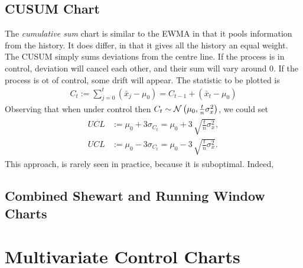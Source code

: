 \subsection{CUSUM Chart}
The \emph{cumulative sum} chart is similar to the EWMA in that it pools information from the history. 
It does differ, in that it gives all the history an equal weight. 
The CUSUM simply sums deviations from the centre line.
If the process is in control, deviation will cancel each other, and their sum will vary around $0$. 
If the process is ot of control, some drift will appear. 
The statistic to be plotted is 
\begin{align}
	C_t:= \sum_{j=0}^{t}(\bar{x}_j-\mu_0)=C_{t-1}+ (\bar{x}_t-\mu_0)
\end{align} 
Observing that when under control then $C_t \sim \mathcal{N}\left(\mu_0, \frac{t}{n} \sigma_x^2\right)$, we could set 
\begin{align}
\begin{split}
	UCL &:= \mu_0 + 3 \sigma_{C_t}= \mu_0 + 3 \, \sqrt{\frac{t}{n} \sigma_x^2},  \\
	UCL &:= \mu_0 - 3 \sigma_{C_t}= \mu_0 - 3 \, \sqrt{\frac{t}{n} \sigma_x^2}.
\end{split}
\end{align}
This approach, is rarely seen in practice, because it is suboptimal.
Indeed, 








\subsection{Combined Shewart and Running Window Charts}






\begin{extra}
\end{extra}








\section{Multivariate Control Charts}
\label{sec:multivariate}




